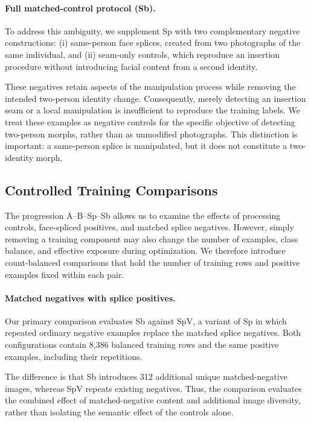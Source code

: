 \paragraph{Full matched-control protocol (Sb).}
To address this ambiguity, we supplement Sp with
two complementary negative constructions:
(i) same-person face splices, created from two
photographs of the same individual, and
(ii) seam-only controls, which reproduce an
insertion procedure without introducing facial
content from a second identity.

These negatives retain aspects of the manipulation
process while removing the intended two-person
identity change. Consequently, merely detecting
an insertion seam or a local manipulation is
insufficient to reproduce the training labels.
We treat these examples as negative controls for
the specific objective of detecting two-person
morphs, rather than as unmodified photographs.
This distinction is important: a same-person splice
is manipulated, but it does not constitute a
two-identity morph.

\subsection{Controlled Training Comparisons}
\label{sec:training_comparisons}

The progression A--B--Sp--Sb allows us to examine
the effects of processing controls, face-spliced
positives, and matched splice negatives.
However, simply removing a training component may
also change the number of examples, class balance,
and effective exposure during optimization.
We therefore introduce count-balanced comparisons
that hold the number of training rows and positive
examples fixed within each pair.

\paragraph{Matched negatives with splice positives.}
Our primary comparison evaluates Sb against SpV,
a variant of Sp in which repeated ordinary negative
examples replace the matched splice negatives.
Both configurations contain 8,386 balanced training
rows and the same positive examples, including
their repetitions.

The difference is that Sb introduces 312 additional
unique matched-negative images, whereas SpV repeats
existing negatives. Thus, the comparison evaluates
the combined effect of matched-negative content and
additional image diversity, rather than isolating
the semantic effect of the controls alone.

